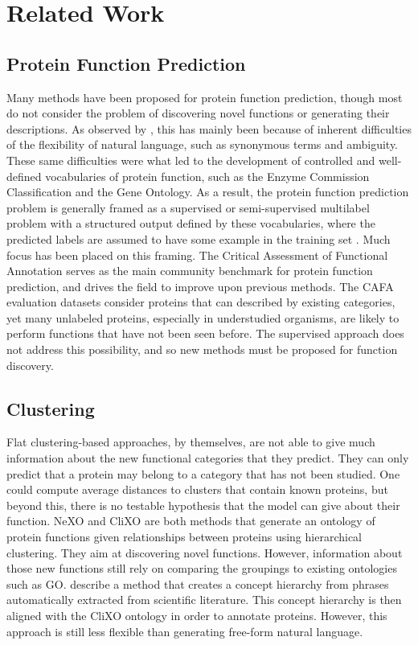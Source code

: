 \documentclass{article}
\begin{document}
    \section{Related Work}
    \subsection{Protein Function Prediction} 
    Many methods have been proposed for protein function prediction, though most do not consider the problem of discovering novel functions or generating their descriptions.
	As observed by \cite{friedberg2006automated}, this has mainly been because of inherent difficulties of the flexibility of natural language, such as synonymous terms and ambiguity. 
    These same difficulties were what led to the development of controlled and well-defined vocabularies of protein function, such as the Enzyme Commission Classification \citep{webb1992enzyme} and the Gene Ontology.
    As a result, the protein function prediction problem is generally framed as a supervised or semi-supervised multilabel problem with a structured output defined by these vocabularies, where the predicted labels are assumed to have some example in the training set \citep{bonetta2020machine}.
    Much focus has been placed on this framing. 
	The Critical Assessment of Functional Annotation \citep{CAFA3} serves as the main community benchmark for protein function prediction, and drives the field to improve upon previous methods.
	The CAFA evaluation datasets consider proteins that can described by existing categories, yet many unlabeled proteins, especially in understudied organisms, are likely to perform functions that have not been seen before.
    The supervised approach does not address this possibility, and so new methods must be proposed for function discovery.
	\subsection{Clustering}
    Flat clustering-based approaches, by themselves, are not able to give much information about the new functional categories that they predict.
    They can only predict that a protein may belong to a category that has not been studied.
    One could compute average distances to clusters that contain known proteins, but beyond this, there is no testable hypothesis that the model can give about their function.
    NeXO \citep{NeXO} and CliXO \citep{CliXO} are both methods that generate an ontology of protein functions given relationships between proteins using hierarchical clustering. They aim at discovering novel functions. 
	However, information about those new functions still rely on comparing the groupings to existing ontologies such as GO. 
    \cite{wang2018annotating} describe a method that creates a concept hierarchy from phrases automatically extracted from scientific literature. This concept hierarchy is then aligned with the CliXO ontology in order to annotate proteins. However, this approach is still less flexible than generating free-form natural language.
\end{document}
